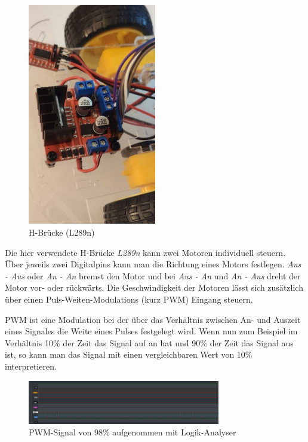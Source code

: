 \documentclass{article}
\begin{document}
\begin{figure}[H]
  \begin{center}
    \includegraphics[width=0.5\textwidth]{l298n}
    \caption{H-Brücke (L289n)}
  \end{center}
\end{figure}

Die hier verwendete H-Brücke \textit{L289n} kann zwei Motoren individuell steuern. Über jeweils zwei Digitalpins kann man die Richtung
eines Motors festlegen. \textit{Aus - Aus} oder \textit{An - An} bremst den Motor und bei \textit{Aus - An} und \textit{An - Aus}
dreht der Motor vor- oder rückwärts. Die Geschwindigkeit der Motoren lässt sich zusätzlich über einen
Puls-Weiten-Modulations (kurz PWM) Eingang steuern.

PWM ist eine Modulation bei der über das Verhältnis zwischen An- und Auszeit eines Signales die Weite eines Pulses festgelegt wird. Wenn nun
zum Beispiel im Verhältnis 10\% der Zeit das Signal auf an hat und 90\% der Zeit das Signal aus ist,
so kann man das Signal mit einen vergleichbaren Wert von 10\% interpretieren.

\begin{figure}[H]
  \begin{center}
    \includegraphics[width=0.75\textwidth]{pwm}
    \caption{PWM-Signal von 98\% aufgenommen mit Logik-Analyser}
  \end{center}
\end{figure}
\end{document}

